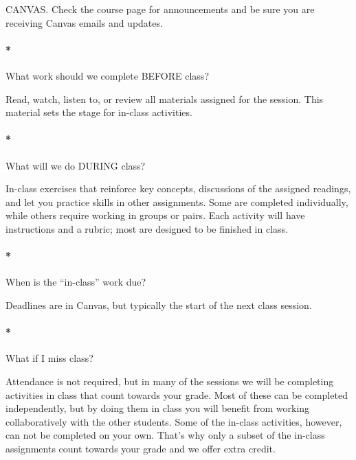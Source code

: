 \documentclass[
  10pt,
  letterpaper,
  oneside,
  open=any]{scrbook}
\let\oldparagraph\paragraph
\renewcommand{\paragraph}[1]{\oldparagraph{#1}\mbox{}}
\begin{document}
CANVAS. Check the course page for announcements and be sure you are
receiving Canvas emails and updates.

\paragraph*{What work should we complete BEFORE
class?}\label{what-work-should-we-complete-before-class}

Read, watch, listen to, or review all materials assigned for the
session. This material sets the stage for in-class activities.

\paragraph*{What will we do DURING
class?}\label{what-will-we-do-during-class}

In-class exercises that reinforce key concepts, discussions of the
assigned readings, and let you practice skills in other assignments.
Some are completed individually, while others require working in groups
or pairs. Each activity will have instructions and a rubric; most are
designed to be finished in class.

\paragraph*{When is the ``in-class'' work
due?}\label{when-is-the-in-class-work-due}

Deadlines are in Canvas, but typically the start of the next class
session.

\paragraph*{What if I miss class?}\label{what-if-i-miss-class}

Attendance is not required, but in many of the sessions we will be
completing activities in class that count towards your grade. Most of
these can be completed independently, but by doing them in class you
will benefit from working collaboratively with the other students. Some
of the in-class activities, however, can not be completed on your own.
That's why only a subset of the in-class assignments count towards your
grade and we offer extra credit.
\end{document}

